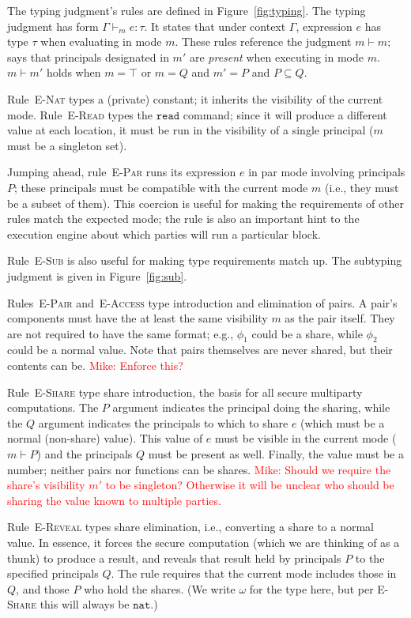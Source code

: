 \documentclass[10pt]{article}
\newcommand{\rulelab}[1]{{\small \textsc{#1}}}
\newcommand{\kw}[1]{\ensuremath{\mathtt{#1}}}
\newcommand{\tnat}{\ensuremath{\mathtt{nat}}}
\newcommand{\hastyp}[4]{\ensuremath{{#1} \vdash_{#2} {#3} : {#4}}}
\newcommand{\mwh}[1]{\textcolor{red}{Mike: #1}}
\begin{document}
The typing judgment's rules are defined in Figure~\ref{fig:typing}.
The typing judgment has form $\hastyp{\Gamma}{m}{e}{\tau}$. It states
that under context $\Gamma$, expression $e$ has type $\tau$ when
evaluating in mode $m$. These rules reference the judgment
$m \vdash m;$ says that principals designated in $m'$ are
\emph{present} when executing in mode $m$. $m \vdash m'$ holds when
$m = \top$ or $m = Q$ and $m' = P$ and $P \subseteq Q$.

Rule~\rulelab{E-Nat} types a (private) constant; it inherits the
visibility of the current mode. Rule~\rulelab{E-Read} types the
\kw{read} command; since it will produce a different value at each
location, it must be run in the visibility of a single principal ($m$
must be a singleton set).

Jumping ahead, rule~\rulelab{E-Par} runs its expression $e$ in par
mode involving principals $P$; these principals must be compatible
with the current mode $m$ (i.e., they must be a subset of them). This
coercion is useful for making the requirements of other rules match
the expected mode; the rule is also an important hint to the execution
engine about which parties will run a particular block.

Rule~\rulelab{E-Sub} is also useful for making type requirements match
up. The subtyping judgment is given in Figure~\ref{fig:sub}.

Rules~\rulelab{E-Pair} and~\rulelab{E-Access} type introduction and
elimination of pairs. A pair's components must have the 
at least the same visibility $m$ as the pair itself. They are not required to have the
same format; e.g., $\phi_1$ could be a share, while $\phi_2$ could be
a normal value. Note that pairs themselves are never shared, but their
contents can be. \mwh{Enforce this?}

Rule~\rulelab{E-Share} type share introduction, the basis for all secure
multiparty computations. The $P$ argument indicates the principal
doing the sharing, while the $Q$ argument indicates the principals to
which to share $e$ (which must be a normal (non-share)
value). This value of $e$ must be visible in the current mode ($m \vdash P$)
and the principals $Q$ must be present as well. Finally, the value
must be a number; neither pairs nor functions can be shares. 
\mwh{Should we require the share's visibility $m'$ to be singleton?
  Otherwise it will be unclear who should be sharing the value known
  to multiple parties.}

Rule~\rulelab{E-Reveal} types share elimination, i.e., converting a
share to a normal value. In essence, it forces the secure computation
(which we are thinking of as a thunk) to produce a result, and reveals
that result held by principals $P$ to the specified principals
$Q$. The rule requires that the current mode includes those in $Q$,
and those $P$ who hold the shares. (We write $\omega$ for the type
here, but per \rulelab{E-Share} this will always be $\tnat$.)
\end{document}
